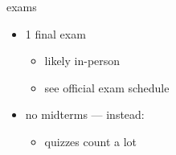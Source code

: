 \begin{frame}{exams}
    \begin{itemize}
    \item 1 final exam
        \begin{itemize}
        \item likely in-person
        \item see official exam schedule
        \end{itemize}
    \item no midterms --- instead:
        \begin{itemize}
        \item quizzes count a lot
        \end{itemize}
    \end{itemize}
\end{frame}

